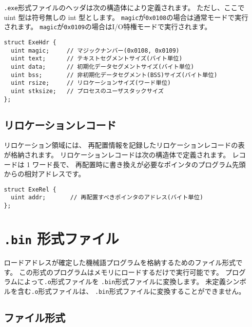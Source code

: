 {\tt .exe}形式ファイルのヘッダは次の構造体により定義されます。
ただし、ここで uint 型は符号無しの int 型とします。
\verb/magic/が\verb/0x0108/の場合は通常モードで実行されます。
\verb/magic/が\verb/0x0109/の場合はI/O特権モードで実行されます。

\begin{mylist}
\begin{verbatim}
struct ExeHdr {
  uint magic;     // マジックナンバー(0x0108, 0x0109)
  uint text;      // テキストセグメントサイズ(バイト単位)
  uint data;      // 初期化データセグメントサイズ(バイト単位)
  uint bss;       // 非初期化データセグメント(BSS)サイズ(バイト単位)
  uint rsize;     // リロケーションサイズ(ワード単位)
  uint stksize;   // プロセスのユーザスタックサイズ
};
\end{verbatim}
\end{mylist}

\subsection{リロケーションレコード}

リロケーション領域には、
再配置情報を記録したリロケーションレコードの表が格納されます。
リロケーションレコードは次の構造体で定義されます。
レコードは 1 ワード長で、
再配置時に書き換えが必要なポインタのプログラム先頭からの相対アドレスです。

\begin{mylist}
\begin{verbatim}
struct ExeRel {
  uint addr;       // 再配置すべきポインタのアドレス(バイト単位)
};
\end{verbatim}
\end{mylist}

\section{{\tt .bin} 形式ファイル}
\label{app:bformat}

ロードアドレスが確定した機械語プログラムを格納するためのファイル形式です。
この形式のプログラムはメモリにロードするだけで実行可能です。
{\objbin}プログラムによって{\tt .o}形式ファイルを
{\tt .bin}形式ファイルに変換します。
未定義シンボルを含む{\tt .o}形式ファイルは、
{\tt .bin}形式ファイルに変換することができません。

\subsection{ファイル形式}


